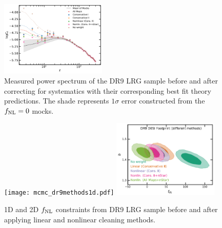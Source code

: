 \begin{figure}
    \centering
    \includegraphics[width=0.45\textwidth]{figures/model_dr9.pdf} 
    \caption{Measured power spectrum of the DR9 LRG sample before and after correcting for systematics with their corresponding best fit theory predictions. The shade represents $1\sigma$ error constructed from the $f_{\rm NL}=0$ mocks.}
    \label{fig:cl_dr9}
\end{figure}

\begin{figure}
    \centering
    \texttt{[image: mcmc\_dr9methods1d.pdf]}
    \includegraphics[width=0.45\textwidth]{figures/mcmc_dr9methods.pdf} 
    \caption{1D and 2D $f_{\rm NL}$ constraints from DR9 LRG sample before and after applying linear and nonlinear cleaning methods.}\label{fig:mcmc_dr9}
\end{figure}

